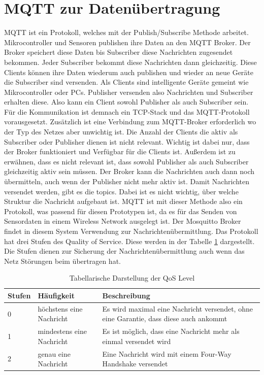 \section{MQTT zur Datenübertragung}
MQTT ist ein Protokoll, welches mit der Publish/Subscribe Methode arbeitet. Mikrocontroller und Sensoren publishen ihre Daten an den MQTT Broker. Der Broker speichert diese Daten bis Subscriber diese Nachrichten zugesendet bekommen. Jeder Subscriber bekommt diese Nachrichten dann gleichzeitig. Diese Clients können ihre Daten wiederum auch publishen und wieder an neue Geräte die Subscriber sind versenden. Als Clients sind intelligente Geräte gemeint wie Mikrocontroller oder PCs. Publisher versenden also Nachrichten und Subscriber erhalten diese. Also kann ein Client sowohl Publisher als auch Subscriber sein. \citep{soni2017survey} Für die Kommunikation ist demnach ein TCP-Stack und das MQTT-Protokoll vorausgesetzt. Zusätzlich ist eine Verbindung zum MQTT-Broker erforderlich wo der Typ des Netzes aber unwichtig ist. Die Anzahl der Clients die aktiv als Subscriber oder Publisher dienen ist nicht relevant. Wichtig ist dabei nur, dass der Broker funktioniert und Verfügbar für die Clients ist. Außerdem ist zu erwähnen, dass es nicht relevant ist, dass sowohl Publisher als auch Subscriber gleichzeitig aktiv sein müssen. Der Broker kann die Nachrichten auch dann noch übermitteln, auch wenn der Publisher nicht mehr aktiv ist. Damit Nachrichten versendet werden, gibt es die topics. Dabei ist es nicht wichtig, über welche Struktur die Nachricht aufgebaut ist. \citep{Trojan2017}
\newline
MQTT ist mit dieser Methode also ein Protokoll, was passend für diesen Prototypen ist, da es für das Senden von Sensordaten in einem Wireless Network ausgelegt ist. Der Mosquitto Broker findet in diesem System Verwendung zur Nachrichtenübermittlung. 
\newline
\newline
Das Protokoll hat drei Stufen des Quality of Service. Diese werden in der Tabelle \ref{tab:tableqos} dargestellt. Die Stufen dienen zur Sicherung der Nachrichtenübermittlung auch wenn das Netz Störungen beim übertragen hat.

\begin{table}[ht]
	\centering
	\caption[Tabellarische Darstellung der QoS Level]{Tabellarische Darstellung der QoS Level \citep{soni2017survey}}
		\vspace{1.0em}	
	\begin{tabular}{| l | l | p{5cm}|}
		\hline
		\rowcolor[gray]{0.9}\textbf{Stufen} & \textbf{Häufigkeit} & \textbf{Beschreibung} \\
		\hline
		\hline
		0 & höchstens eine Nachricht & Es wird maximal eine Nachricht versendet, ohne eine Garantie, dass diese auch ankommt \\
		\hline
		1 & mindestens eine Nachricht & Es ist möglich, dass eine Nachricht mehr als einmal versendet wird\\
		\hline
		2 & genau eine Nachricht & Eine Nachricht wird mit einem Four-Way Handshake versendet\\
		\hline
	\end{tabular}
	\label{tab:tableqos}
\end{table}

